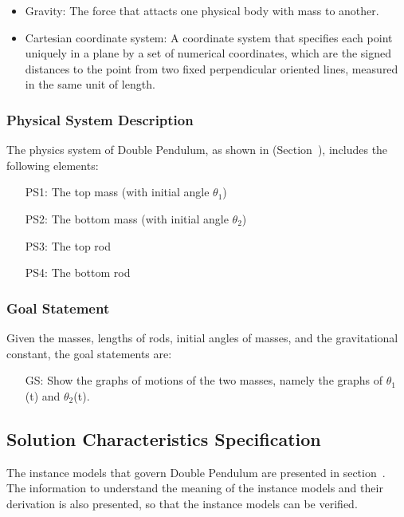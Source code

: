 \documentclass[12pt]{article}
\newcounter{goalnum} %
\begin{document}
\begin{itemize}

\item Gravity: The force that attacts one physical body with mass to another.  
\item Cartesian coordinate system: A coordinate system that specifies each point uniquely in a plane by a set of numerical coordinates, which are the signed distances to the point from two fixed perpendicular oriented lines, measured in the same unit of length. 

\end{itemize}


\subsubsection{Physical System Description}\label{sec_physicsSysDes}
The physics system of Double Pendulum, as shown in (Section~), includes the following elements:
\begin{itemize}

\item[PS1:] The top mass (with initial angle $\theta_1$)
\item[PS2:] The bottom mass (with initial angle $\theta_2$)
\item[PS3:] The top rod
\item[PS4:] The bottom rod

\end{itemize}

\subsubsection{Goal Statement}\label{sec_goalState}
Given the masses, lengths of rods, initial angles of masses, and the gravitational constant, the goal statements are:
\begin{itemize}

\item[GS\refstepcounter{goalnum}\thegoalnum \label{G_meaningfulLabel}:] Show the graphs of motions of the two masses, namely the graphs of $\theta_1$(t) and $\theta_2$(t).
\end{itemize}

\subsection{Solution Characteristics Specification}\label{sec_solotionSpec}
The instance models that govern Double Pendulum are presented in section~. The information to understand the meaning of the instance models and their derivation is also presented, so that the instance models can be verified. 
\end{document}
